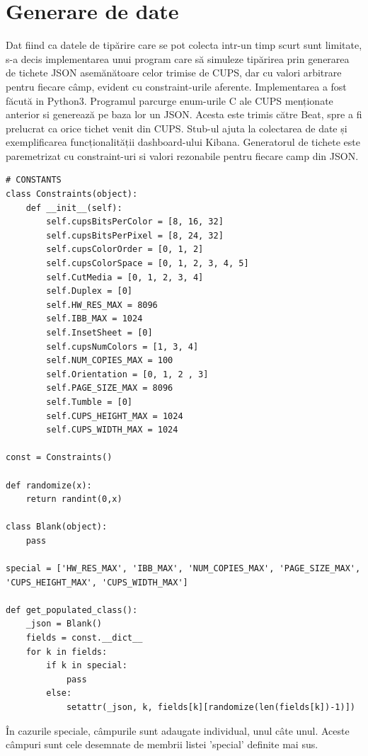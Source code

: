 \documentclass[a4paper, 12pt, twoside]{report}
\begin{document}
	\section{Generare de date}
	Dat fiind ca datele de tipărire care se pot colecta intr-un timp scurt sunt limitate, s-a decis implementarea unui program care să simuleze tipărirea prin generarea de tichete JSON asemănătoare celor trimise de CUPS, dar cu valori arbitrare pentru fiecare câmp, evident cu constraint-urile aferente. Implementarea a fost făcută in Python3. Programul parcurge enum-urile C ale CUPS menționate anterior si generează pe baza lor un JSON. Acesta este trimis către Beat, spre a fi prelucrat ca orice tichet venit din CUPS. Stub-ul ajuta la colectarea de date și exemplificarea funcționalității dashboard-ului Kibana. Generatorul de tichete este paremetrizat cu constraint-uri si valori rezonabile pentru fiecare camp din JSON.  
\begin{lstlisting}[caption={cazul general dupa care se populeaza tichetul - Pyton},captionpos=b]
# CONSTANTS
class Constraints(object):
    def __init__(self):
        self.cupsBitsPerColor = [8, 16, 32]
        self.cupsBitsPerPixel = [8, 24, 32]
        self.cupsColorOrder = [0, 1, 2]
        self.cupsColorSpace = [0, 1, 2, 3, 4, 5]
        self.CutMedia = [0, 1, 2, 3, 4]
        self.Duplex = [0]
        self.HW_RES_MAX = 8096
        self.IBB_MAX = 1024
        self.InsetSheet = [0]
        self.cupsNumColors = [1, 3, 4]
        self.NUM_COPIES_MAX = 100
        self.Orientation = [0, 1, 2 , 3]
        self.PAGE_SIZE_MAX = 8096
        self.Tumble = [0]
        self.CUPS_HEIGHT_MAX = 1024
        self.CUPS_WIDTH_MAX = 1024

const = Constraints()

def randomize(x):
    return randint(0,x)

class Blank(object):
    pass

special = ['HW_RES_MAX', 'IBB_MAX', 'NUM_COPIES_MAX', 'PAGE_SIZE_MAX', 'CUPS_HEIGHT_MAX', 'CUPS_WIDTH_MAX']

def get_populated_class():
    _json = Blank()
    fields = const.__dict__
    for k in fields:
        if k in special:
            pass
        else:
            setattr(_json, k, fields[k][randomize(len(fields[k])-1)])
\end{lstlisting}
În cazurile speciale, câmpurile sunt adaugate individual, unul câte unul. Aceste câmpuri sunt cele desemnate de membrii listei 'special' definite mai sus.
\end{document}
